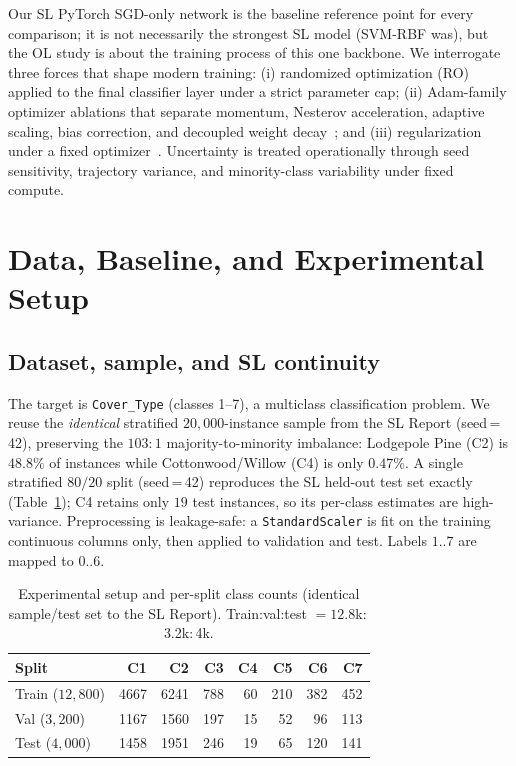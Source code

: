 \documentclass[letterpaper, 10pt, conference]{ieeeconf}
\begin{document}
Our SL PyTorch SGD-only network is the baseline reference point for every
comparison; it is not necessarily the strongest SL model (SVM-RBF was), but the
OL study is about the training process of this one backbone. We interrogate
three forces that shape modern training: (i) randomized optimization (RO) applied
to the final classifier layer under a strict parameter cap; (ii) Adam-family
optimizer ablations that separate momentum, Nesterov acceleration, adaptive
scaling, bias correction, and decoupled weight decay~\cite{kingma2015,loshchilov2019};
and (iii) regularization under a fixed optimizer~\cite{srivastava2014,muller2019}.
Uncertainty is treated operationally through seed sensitivity, trajectory
variance, and minority-class variability under fixed compute.

\section{Data, Baseline, and Experimental Setup}
\label{sec:setup}

\subsection{Dataset, sample, and SL continuity}
The target is \texttt{Cover\_Type} (classes 1--7), a multiclass classification
problem. We reuse the \emph{identical} stratified $20{,}000$-instance sample from
the SL Report (seed\,=\,42), preserving the $103{:}1$ majority-to-minority
imbalance: Lodgepole Pine (C2) is $48.8\%$ of instances while Cottonwood/Willow
(C4) is only $0.47\%$. A single stratified $80/20$ split (seed\,=\,42) reproduces
the SL held-out test set exactly (Table~\ref{tab:setup}); C4 retains only $19$
test instances, so its per-class estimates are high-variance. Preprocessing is
leakage-safe: a \texttt{StandardScaler} is fit on the training continuous columns
only, then applied to validation and test. Labels $1..7$ are mapped to $0..6$.

\begin{table}[t]
\caption{Experimental setup and per-split class counts (identical sample/test
  set to the SL Report). Train:val:test $=12.8$k$:$3.2k$:$4k.}
\label{tab:setup}
\centering\small
\begin{tabular}{@{}lrrrrrrr@{}}
\toprule
Split & C1 & C2 & C3 & C4 & C5 & C6 & C7 \\
\midrule
Train ($12{,}800$) & 4667 & 6241 & 788 & 60 & 210 & 382 & 452 \\
Val   ($3{,}200$)  & 1167 & 1560 & 197 & 15 & 52  & 96  & 113 \\
Test  ($4{,}000$)  & 1458 & 1951 & 246 & 19 & 65  & 120 & 141 \\
\bottomrule
\end{tabular}
\end{table}
\end{document}
